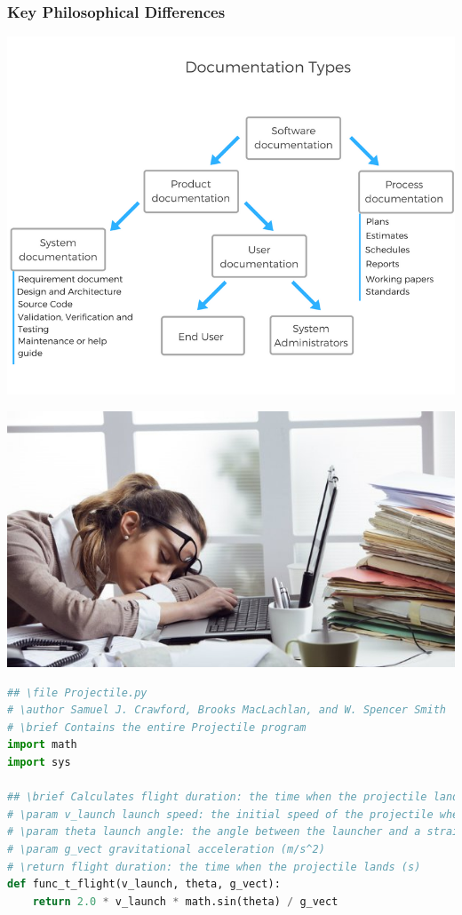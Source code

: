 \documentclass[usenames,dvipsnames,10pt]{beamer}
\begin{document}
\begin{frame}[fragile]
  
  \frametitle{Key Philosophical Differences}
\begin{minipage}{0.48\textwidth}
\includegraphics[width=1.0\textwidth]{DocKinds.png}
\end{minipage}
\begin{minipage}{0.48\textwidth}
\includegraphics[width=1.0\textwidth]{BoredAtWork.jpg}
\end{minipage}

\begin{lstlisting}[language=Python,basicstyle=\ttfamily\tiny,
  keywordstyle=\bfseries,breaklines=false]
## \file Projectile.py
# \author Samuel J. Crawford, Brooks MacLachlan, and W. Spencer Smith
# \brief Contains the entire Projectile program
import math
import sys

## \brief Calculates flight duration: the time when the projectile lands (s)
# \param v_launch launch speed: the initial speed of the projectile when launched (m/s)
# \param theta launch angle: the angle between the launcher and a straight line from the launcher to the target (rad)
# \param g_vect gravitational acceleration (m/s^2)
# \return flight duration: the time when the projectile lands (s)
def func_t_flight(v_launch, theta, g_vect):
    return 2.0 * v_launch * math.sin(theta) / g_vect

\end{lstlisting}
\end{frame}
  
\end{document}
